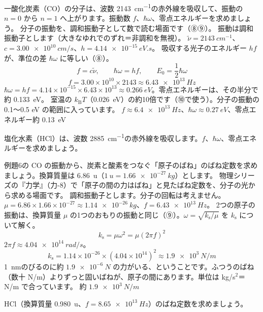 \label{ph:原-6:ex6}
\begin{phreidai}[CO の振動のエネルギー]
一酸化炭素（CO）の分子は、波数 \qty{2143}{cm^{-1}}の赤外線を吸収して、振動の $n=0$ から $n=1$ へ上がります。振動数 $f$、$\hbar\omega$、零点エネルギーを求めましょう。
\phbamen
分子の振動を、調和振動子として数で読む場面です（⑧⑨）。
\phmushi
振動は調和振動子とします（大きなゆれでのずれ＝非調和を無視）。
\phzu
$\tilde\nu=\qty{2143}{cm^{-1}}$、$c=\qty{3.00e10}{cm/s}$、$h=\qty{4.14e-15}{eV.s}$。
\phriyu
吸収する光子のエネルギー $hf$ が、準位の差 $\hbar\omega$ に等しい（⑧）。
\phtateru
\[f=c\tilde\nu,\qquad \hbar\omega=hf,\qquad E_0=\frac12\hbar\omega\]
\phtoku
\[f=3.00\times10^{10}\times2143\approx\qty{6.43e13}{Hz}\]
$\hbar\omega=hf=4.14\times10^{-15}\times6.43\times10^{13}\approx\qty{0.266}{eV}$。零点エネルギーは、その半分で約 \qty{0.133}{eV}。
\phtashikame
室温の $k_{\mathrm B}T$（\qty{0.026}{eV}）の約10倍です（⑩で使う）。分子の振動の 0.1〜0.5 eV の範囲に入っています。
\kotae $f\approx\qty{6.4e13}{Hz}$、$\hbar\omega\approx\qty{0.27}{eV}$、零点エネルギー約 \qty{0.13}{eV}
\end{phreidai}
\begin{jibun}
塩化水素（HCl）は、波数 \qty{2885}{cm^{-1}}の赤外線を吸収します。$f$、$\hbar\omega$、零点エネルギーを求めましょう。
\end{jibun}

\label{ph:原-6:ex7}
\begin{phreidai}[CO の原子のばね定数]
例題6の CO の振動から、炭素と酸素をつなぐ「原子のばね」のばね定数を求めましょう。換算質量は \qty{6.86}{u}（$\qty{1}{u}=\qty{1.66e-27}{kg}$）とします。
\phbamen
物理シリーズの『力学』（力-8）で「原子の間の力はばね」と見たばね定数を、分子の光から求める場面です。
\phmushi
調和振動子とします。分子の回転は考えません。
\phzu
$\mu=6.86\times1.66\times10^{-27}\approx\qty{1.14e-26}{kg}$、$f=\qty{6.43e13}{Hz}$。
\phriyu
2つの原子の振動は、換算質量 $\mu$ の1つのおもりの振動と同じ（⑨）。$\omega=\sqrt{k_{\mathrm s}/\mu}$ を $k_{\mathrm s}$ について解く。
\phtateru
\[k_{\mathrm s}=\mu\omega^2=\mu(2\pi f)^2\]
\phtoku
$2\pi f\approx\qty{4.04e14}{rad/s}$。
\[k_{\mathrm s}=1.14\times10^{-26}\times(4.04\times10^{14})^2\approx\qty{1.9e3}{N/m}\]
\phtashikame
\qty{1}{nm}のびるのに約 $\qty{1.9e-6}{N}$ の力がいる、ということです。ふつうのばね（数十 N/m）よりずっと固いばねが、原子の間にあります。単位は kg/s$^2$＝N/m で合っています。
\kotae 約 $\qty{1.9e3}{N/m}$
\end{phreidai}
\begin{jibun}
HCl（換算質量 \qty{0.980}{u}、$f=\qty{8.65e13}{Hz}$）のばね定数を求めましょう。
\end{jibun}


